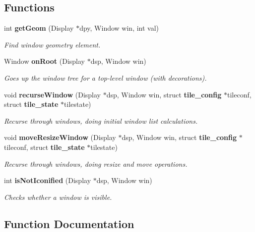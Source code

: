 \subsection*{Functions}
\begin{CompactItemize}
\item 
int {\bf get\-Geom} (Display $\ast$dpy, Window win, int val)
\begin{CompactList}\small\item\em Find window geometry element. \item\end{CompactList}\item 
Window {\bf on\-Root} (Display $\ast$dsp, Window win)
\begin{CompactList}\small\item\em Goes up the window tree for a top-level window (with decorations). \item\end{CompactList}\item 
void {\bf recurse\-Window} (Display $\ast$dsp, Window win, struct {\bf tile\_\-config} $\ast$tileconf, struct {\bf tile\_\-state} $\ast$tilestate)
\begin{CompactList}\small\item\em Recurse through windows, doing initial window list calculations. \item\end{CompactList}\item 
void {\bf move\-Resize\-Window} (Display $\ast$dsp, Window win, struct {\bf tile\_\-config} $\ast$tileconf, struct {\bf tile\_\-state} $\ast$tilestate)
\begin{CompactList}\small\item\em Recurse through windows, doing resize and move operations. \item\end{CompactList}\item 
int {\bf is\-Not\-Iconified} (Display $\ast$dsp, Window win)
\begin{CompactList}\small\item\em Checks whether a window is visible. \item\end{CompactList}\end{CompactItemize}


\subsection{Function Documentation}
